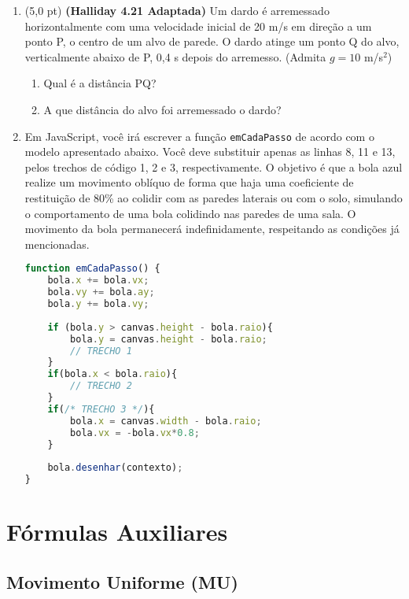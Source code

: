 \documentclass[12pt,a4paper,oneside]{article}
\begin{document}
\begin{enumerate}
	
	\item (5,0 pt) {\bf (Halliday 4.21 Adaptada)} Um dardo é arremessado horizontalmente com uma velocidade inicial de 20 m/s em direção a um ponto P, o centro de um alvo de parede. O dardo atinge um ponto Q do alvo, verticalmente abaixo de P, 0,4 s depois do arremesso. \label{q:dardo} (Admita $g = 10$ m/s$^2$)
	\begin{enumerate}
		\item Qual é a distância PQ?
		\item A que distância do alvo foi arremessado o dardo?
	\end{enumerate}

	\item Em JavaScript, você irá escrever a função {\tt emCadaPasso} de acordo com o modelo apresentado abaixo. Você deve substituir apenas as linhas 8, 11 e 13, pelos trechos de código 1, 2 e 3, respectivamente. O objetivo é que a bola azul realize um movimento oblíquo de forma que haja uma coeficiente de restituição de 80\% ao colidir com as paredes laterais ou com o solo, simulando o comportamento de uma bola colidindo nas paredes de uma sala. O movimento da bola permanecerá indefinidamente, respeitando as condições já mencionadas.

\begin{lstlisting}[language=JavaScript]
function emCadaPasso() {    
	bola.x += bola.vx;
	bola.vy += bola.ay;
	bola.y += bola.vy;
	
	if (bola.y > canvas.height - bola.raio){ 
		bola.y = canvas.height - bola.raio; 
		// TRECHO 1
	}
	if(bola.x < bola.raio){
		// TRECHO 2
	}
	if(/* TRECHO 3 */){
		bola.x = canvas.width - bola.raio;
		bola.vx = -bola.vx*0.8;
	}
	
	bola.desenhar(contexto); 
}\end{lstlisting}

\end{enumerate}

\newpage
 
\section{Fórmulas Auxiliares}

\subsection{Movimento Uniforme (MU)}
\end{document}
